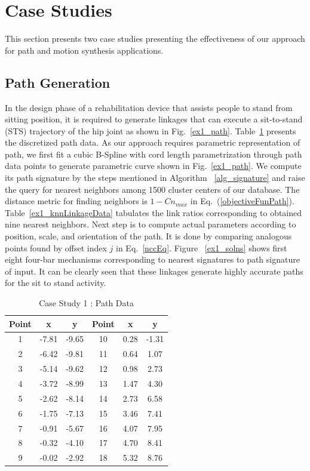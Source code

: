 \documentclass[twocolumn,10pt]{asme2e}
\newcommand{\req}[1]{(\ref{#1})}
\begin{document}
\section{Case Studies}\label{sec_example}
This section presents two case studies presenting the effectiveness of our approach for path and motion synthesis applications.
\subsection{Path Generation}
In the design phase of a rehabilitation device that assists people to stand from sitting position, it is required to generate linkages that can execute a sit-to-stand (STS) trajectory of the hip joint as shown in Fig.~\ref{ex1_path}.
Table~\ref{hipPathTab} presents the discretized path data.
As our approach requires parametric representation of path, we first fit a cubic B-Spline with cord length parametrization through path data points to generate parametric curve shown in Fig.~\ref{ex1_path}.
We compute its path signature by the steps mentioned in Algorithm ~\ref{alg_signature} and raise the query for nearest neighbors among 1500 cluster centers of our database.
The distance metric for finding neighbors is $1-Cn_{max}$ in Eq.~\req{objectiveFunPath}.
Table~\ref{ex1_knnLinkageData} tabulates the link ratios corresponding to obtained nine nearest neighbors.
Next step is to compute actual parameters according to position, scale, and orientation of the path.
It is done by comparing analogous points found by offset index $j$ in Eq.~\ref{nccEq}.
Figure ~\ref{ex1_solns} shows first eight four-bar mechanisms corresponding to nearest signatures to path signature of input.
It can be clearly seen that these linkages generate highly accurate paths for the sit to stand activity.

\begin{table}
\caption{Case Study 1 : Path Data}
\centering
\label{hipPathTab}
\begin{tabular}{cccccc}
\hline
Point & x & y & Point & x & y \\
\hline
1 & -7.81 & -9.65 & 10 & 0.28 & -1.31 \\
2 & -6.42 & -9.81 & 11 & 0.64 & 1.07 \\
3 & -5.14 & -9.62 & 12 & 0.98 & 2.73 \\
4 & -3.72 & -8.99 & 13 & 1.47 & 4.30 \\
5 & -2.62 & -8.14 & 14 & 2.73 & 6.58 \\
6 & -1.75 & -7.13 & 15 & 3.46 & 7.41 \\
7 & -0.91 & -5.67 & 16 & 4.07 & 7.95 \\
8 & -0.32 & -4.10 & 17 & 4.70 & 8.41 \\
9 & -0.02 & -2.92 & 18 & 5.32 & 8.76 \\
\end{tabular}
\end{table}
\end{document}
